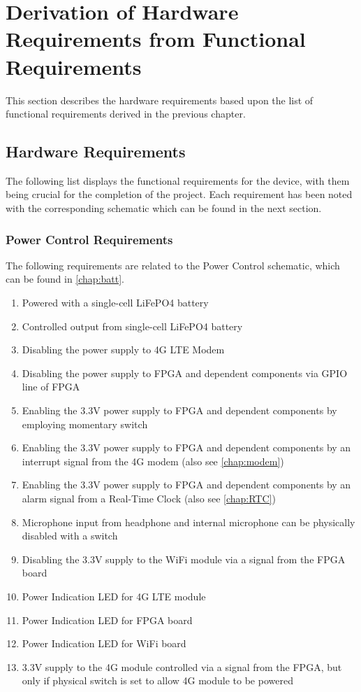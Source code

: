 
\chapter{Derivation of Hardware Requirements from Functional Requirements} %

\label{Chapter4} %

This section describes the hardware requirements based upon the list of functional requirements derived in the previous chapter.

\section{Hardware Requirements}

The following list displays the functional requirements for the device, with them being crucial for the completion of the project. Each requirement has been noted with the corresponding schematic which can be found in the next section.

\subsection{Power Control Requirements}
The following requirements are related to the Power Control schematic, which can be found in \autoref{chap:batt}.
\begin{enumerate}
\item Powered with a single-cell LiFePO4 battery
\item Controlled output from single-cell LiFePO4 battery 
\item Disabling the power supply to 4G LTE Modem
\item Disabling the power supply to FPGA and dependent components via GPIO line of FPGA
\item Enabling the 3.3V power supply to FPGA and dependent components by employing momentary switch
\item Enabling the 3.3V power supply to FPGA and dependent components by an interrupt signal from the 4G modem (also see \autoref{chap:modem})
\item Enabling the 3.3V power supply to FPGA and dependent components by an alarm signal from a Real-Time Clock (also see \autoref{chap:RTC})
\item Microphone input from headphone and internal microphone can be physically disabled with a switch 
\item Disabling the 3.3V supply to the WiFi module via a signal from the FPGA board
\item Power Indication LED for 4G LTE module
\item Power Indication LED for FPGA board 
\item Power Indication LED for WiFi board
\item 3.3V supply to the 4G module controlled via a signal from the FPGA, but only if physical switch is set to allow 4G module to be powered
\end{enumerate}

